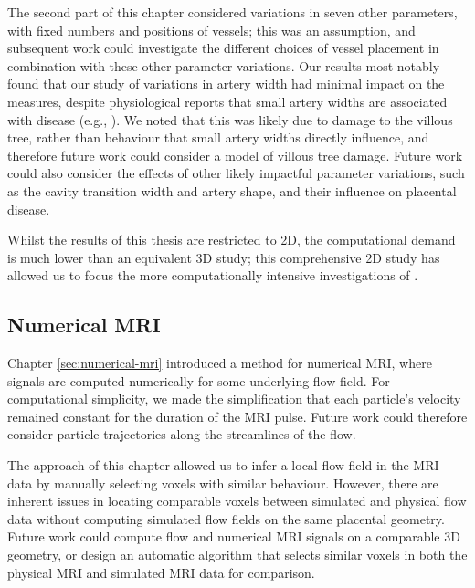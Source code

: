             The second part of this chapter considered variations in seven other parameters, with fixed numbers and positions of vessels; this was an assumption, and subsequent work could investigate the different choices of vessel placement in combination with these other parameter variations. Our results most notably found that our study of variations in artery width had minimal impact on the measures, despite physiological reports that small artery widths are associated with disease (e.g., \cite{burtonRheologicalPhysiologicalConsequences2009}). We noted that this was likely due to damage to the villous tree, rather than behaviour that small artery widths directly influence, and therefore future work could consider a model of villous tree damage. Future work could also consider the effects of other likely impactful parameter variations, such as the cavity transition width and artery shape, and their influence on placental disease.

            Whilst the results of this thesis are restricted to 2D, the computational demand is much lower than an equivalent 3D study; this comprehensive 2D study has allowed us to focus the more computationally intensive investigations of \citeauthor{crowsonInvestigatingPlacentalHemodynamics2024} \cite{crowsonInvestigatingPlacentalHemodynamics2024}.

        \subsection{Numerical MRI}
            Chapter \ref{sec:numerical-mri} introduced a method for numerical MRI, where signals are computed numerically for some underlying flow field. For computational simplicity, we made the simplification that each particle's velocity remained constant for the duration of the MRI pulse. Future work could therefore consider particle trajectories along the streamlines of the flow.

            The approach of this chapter allowed us to infer a local flow field in the MRI data by manually selecting voxels with similar behaviour. However, there are inherent issues in locating comparable voxels between simulated and physical flow data without computing simulated flow fields on the same placental geometry. Future work could compute flow and numerical MRI signals on a comparable 3D geometry, or design an automatic algorithm that selects similar voxels in both the physical MRI and simulated MRI data for comparison.

